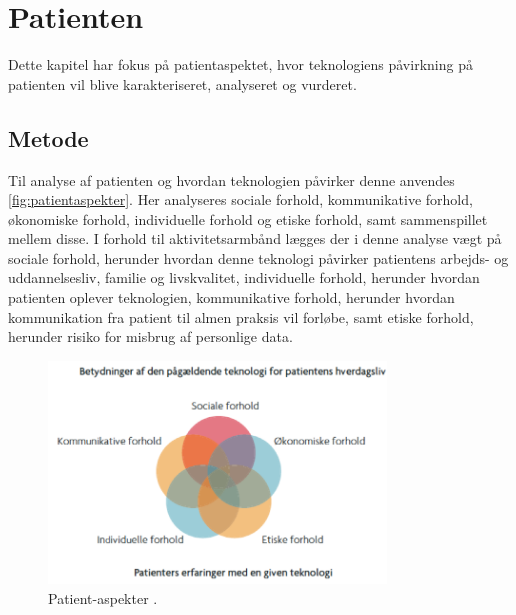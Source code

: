 \chapter{Patienten}
Dette kapitel har fokus på patientaspektet, hvor teknologiens påvirkning på patienten vil blive karakteriseret, analyseret og vurderet. 
\section{Metode}
Til analyse af patienten og hvordan teknologien påvirker denne anvendes \autoref{fig:patientaspekter}. Her analyseres sociale forhold, kommunikative forhold, økonomiske forhold, individuelle forhold og etiske forhold, samt sammenspillet mellem disse. I forhold til aktivitetsarmbånd lægges der i denne analyse vægt på sociale forhold, herunder hvordan denne teknologi påvirker patientens arbejds- og uddannelsesliv, familie og livskvalitet, individuelle forhold, herunder hvordan patienten oplever teknologien, kommunikative forhold, herunder hvordan kommunikation fra patient til almen praksis vil forløbe, samt etiske forhold, herunder risiko for misbrug af personlige data. 


\begin{figure}[H]
\centering
\includegraphics[width=0.8\textwidth]{figures/patientaspekter}
\caption{Patient-aspekter \citep{mtvhaandbog}.}
\label{fig:patientaspekter}
\end{figure}

